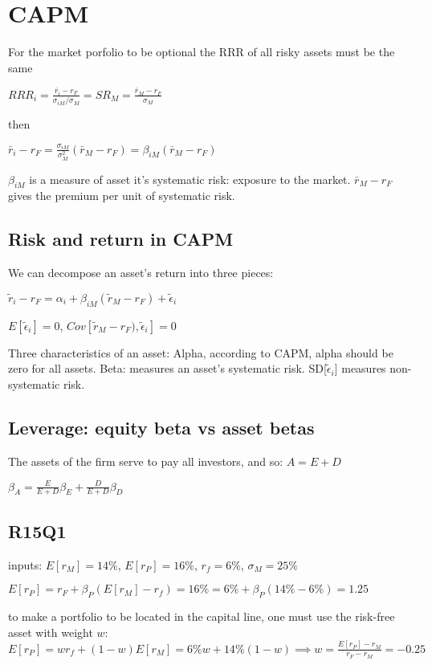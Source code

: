 \section{CAPM}

For the market porfolio to be optional the RRR of all risky assets must be the same

$RRR_i = \frac{\bar{r}_i-r_F}{\sigma_{iM}/ \sigma_M} = SR_M = \frac{\bar{r}_M-r_F}{\sigma_M}$

then

$ \bar{r}_i-r_F = \frac{\sigma_{iM}}{\sigma_M^2} (\bar{r}_M-r_F)  = \beta_{iM} (\bar{r}_M-r_F) $

$\beta_{iM}$ is a measure of asset it's systematic risk: exposure to the market.
$\bar{r}_M-r_F$ gives the premium per unit of systematic risk.

\subsection*{Risk and return in CAPM}
We can decompose an asset’s return into three pieces:


$ \tilde{r}_i-r_F = \alpha_i + \beta_{iM} (\tilde{r}_M-r_F) + \tilde{\epsilon}_i$

$E[\tilde{\epsilon}_i]=0$, $Cov[\tilde{r}_M-r_F) , \tilde{\epsilon}_i]=0$

Three characteristics of an asset: Alpha, according to CAPM, alpha should be zero for all assets. Beta: measures an asset’s systematic risk. SD[$\tilde{\epsilon}_i$] measures non-systematic risk.

\subsection*{Leverage: equity beta vs asset betas}

The assets of the firm serve to pay all investors, and so:
$A=E+D$

$\beta_A = \frac{E}{E+D} \beta_E + \frac{D}{E+D} \beta_D$


\subsection*{R15Q1}
inputs: $E[r_M]=14\%$, $E[r_P]=16\%$, $r_f=6\%$, $\sigma_M=25\%$

$E[r_P] = r_F + \beta_P (E[r_M]-r_f) = 16\% = 6\% + \beta_P (14\% - 6\%) =1.25$

to make a portfolio to be located in the capital line, one must use the risk-free asset with weight $w$:
 $E[r_P]=w r_f + (1-w) E[r_M] = 6\%w+14\%(1-w) \implies w=\frac{E[r_P]-r_M}{r_F-r_M}=-0.25$
 
